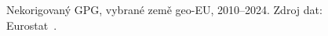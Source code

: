 \def\strProblemyGpgSektorYlabel{nekorigovaný \acs{GPG} [\%]}%
\def\strProblemyGpgSektorCaption{Nekorigovaný \acs{GPG}, vybrané země \acs{geo-EU}, 2010--2024. Zdroj dat: Eurostat~\cite{eurostat_gpg}.}%
%
\begin{figure}[htbp]
  \centering
  \resizebox{\linewidth}{!}{}
  \caption{\strProblemyGpgSektorCaption}
  \label{fig:problemy_gpg_sektor}
\end{figure}
